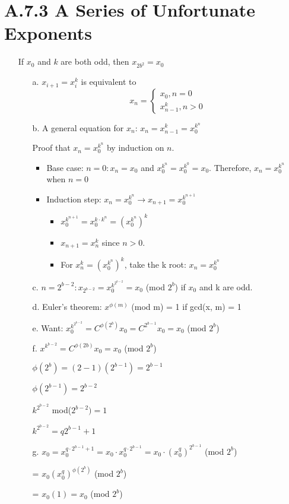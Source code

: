 \documentclass[12pt]{article}
\begin{document}
\section*{A.7.3 A Series of Unfortunate Exponents}
\begin{enumerate}
  \item[] If $x_0$ and $k$ are both odd, then $x_{2b^2} = x_0$ 
    \begin{enumerate}
      \item[a.] $x_{i+1} = x_i^k$ is equivalent to
        \[ x_n = 
          \begin{cases}
            x_0, n = 0 \\
            x_{n-1}^k, n > 0
          \end{cases}
        \]
      \item[b.] A general equation for $x_n$: $x_n = x_{n-1}^k = x_0^{k^n}$
        
        Proof that $x_n = x_0^{k^n}$ by induction on $n$.
        \begin{itemize}
          \item Base case: $n=0: x_n = x_0$ and $x_0^{k^n} = x_0^{k^0} = x_0$. Therefore, $x_n = x_0^{k^n}$ when $n=0$
          \item Induction step: $x_n = x_0^{k^n} \rightarrow x_{n+1} = x_0^{k^{n+1}}$
            \begin{itemize}
              \item $x_0^{k^{n+1}} = x_0^{k\cdot k^n} = (x_0^{k^n})^k$ 
              \item $x_{n+1} = x_n^k$ since $n>0$.
              \item For $x_n^k = (x_0^{k^n})^k$, take the k root: $x_n = x_0^{k^n}$
            \end{itemize}
        \end{itemize}
      \item[c.] $n = 2^{b-2}: x_{2^{b-2}} = x_0^{k^{2^{b-2}}} = x_0$ (mod $2^b$) if $x_0$ and k are odd. 
      \item[d.] Euler's theorem: $x^{\phi(m)}$ (mod m) = 1 if gcd(x, m) = 1
      \item[e.] Want: $x_0^{k^{2^{b-2}}} = C^{\phi(2^b)}x_0 = C^{2^{b-1}}x_0 = x_0$ (mod $2^b$)
      \item[f.] $x^{k^{b-2}} = C^{\phi(2b)}x_0 = x_0$ (mod $2^b$)

        $\phi(2^b) = (2-1)(2^{b-1}) = 2^{b-1}$
        
        $\phi(2^{b-1}) = 2^{b-2}$
        
        $k^{2^{b-2}}$ mod($2^{b-2}) = 1$

        $k^{2^{b-2}} = q 2^{b-1} + 1$
      \item[g.] $x_0 = x_0^{q\cdot2^{b-1} +1} = x_0\cdot x_0^{q\cdot2^{b-1}} = x_0\cdot (x_0^q)^{2^{b-1}}$ (mod $2^b$)

        = $x_0(x_0^q)^{\phi(2^b)}$ (mod $2^b$)

        = $x_0(1) = x_0$ (mod $2^b$)
    \end{enumerate}
\end{enumerate}
\end{document}
